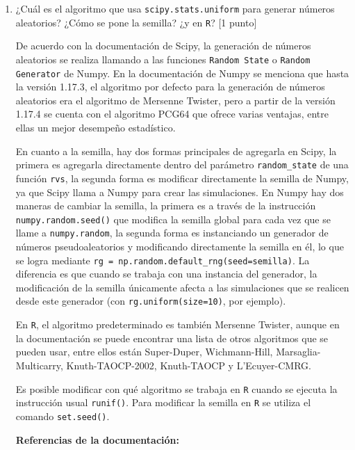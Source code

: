 \documentclass{article}
\begin{document}
\begin{enumerate}
    \item ¿Cuál es el algoritmo que usa \texttt{scipy.stats.uniform} para generar 
    números aleatorios? ¿Cómo se pone la semilla? ¿y en \texttt{R}? [1 punto]


    De acuerdo con la documentación de Scipy, la generación de números aleatorios se realiza llamando
    a las funciones \texttt{Random State} o \texttt{Random Generator} de Numpy. En la documentación
    de Numpy se menciona que hasta la versión 1.17.3, el algoritmo por defecto para la generación
    de números aleatorios era el algoritmo de Mersenne Twister, pero a partir de la versión 1.17.4
    se cuenta con el algoritmo PCG64 que ofrece varias ventajas, entre ellas un mejor desempeño 
    estadístico.

    En cuanto a la semilla, hay dos formas principales de agregarla en Scipy, la primera es agregarla
    directamente dentro del parámetro \texttt{random\_state} de una función \texttt{rvs}, la segunda forma
    es modificar directamente la semilla de Numpy, ya que Scipy llama a Numpy para crear las simulaciones.
    En Numpy hay dos maneras de cambiar la semilla, la primera es a través de la instrucción \texttt{numpy.random.seed()}
    que modifica la semilla global para cada vez que se llame a \texttt{numpy.random}, la segunda forma
    es instanciando un generador de números pseudoaleatorios y modificando directamente la semilla
    en él, lo que se logra mediante \texttt{rg = np.random.default\_rng(seed=semilla)}. La diferencia es que
    cuando se trabaja con una instancia del generador, la modificación de la semilla únicamente afecta
    a las simulaciones que se realicen desde este generador (con \texttt{rg.uniform(size=10)}, por ejemplo).

    En \texttt{R}, el algoritmo predeterminado es también Mersenne Twister, aunque en la documentación
    se puede encontrar una lista de otros algoritmos que se pueden usar, entre ellos están
    Super-Duper, Wichmann-Hill, Marsaglia-Multicarry, Knuth-TAOCP-2002, Knuth-TAOCP y L'Ecuyer-CMRG.

    Es posible modificar con qué algoritmo se trabaja en \texttt{R} cuando se ejecuta la instrucción usual \texttt{runif()}.
    Para modificar la semilla en \texttt R se utiliza el comando \texttt{set.seed()}.

    \textbf{Referencias de la documentación:}


\end{enumerate}
\end{document}

